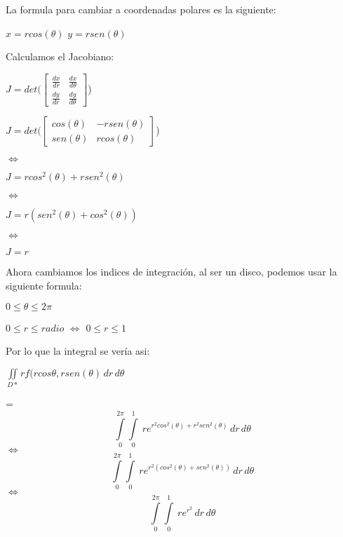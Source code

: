 \noindent La formula para cambiar a coordenadas polares es la siguiente:
\begin{center}
    $x=rcos(\theta)$     $y=rsen(\theta)$
\end{center}

\noindent Calculamos el Jacobiano:
\begin{center}
    $J = det(\begin{bmatrix}
        \frac{dx}{dr} & \frac{dx}{d\theta} \\
        \frac{dy}{dr} & \frac{dy}{d\theta}
    \end{bmatrix}$)
    \vspace{6pt}

    $J = det(\begin{bmatrix}
        cos(\theta) & -rsen(\theta) \\
        sen(\theta) & rcos(\theta)
    \end{bmatrix}$)
    \vspace{6pt}
    
    $\iff$ 
    
    $J = rcos^2(\theta) + rsen^2(\theta)$
    \vspace{6pt}
    
    $\iff$
    
    $J = r(sen^2(\theta)+cos^2(\theta))$
    \vspace{6pt}
    
    $\iff$ 
    \vspace{6pt}
    
    $J = r$
\end{center}

\noindent Ahora cambiamos los indices de integración, al ser un disco, podemos usar la siguiente formula:
\begin{center}
    $0 \leq \theta \leq 2\pi$
    \vspace{6pt}

    $0 \leq r \leq radio$ $\iff$ $0 \leq r \leq 1$
\end{center}

\noindent Por lo que la integral se vería asi:
    \begin{center}
        $\displaystyle\iint\limits_{D*} rf(rcos\theta,rsen(\theta) \, dr \, d\theta$

        =
        \[\displaystyle\int\limits_0^{2\pi} \!\!\int\limits_0^1 \ re^{r^2cos^2(\theta) + r^2sen^2(\theta)} \, dr \, d\theta\]
        $\iff$
        \[\displaystyle\int\limits_0^{2\pi} \!\!\int\limits_0^1 \ re^{r^2(cos^2(\theta) + sen^2(\theta))} \, dr \, d\theta\]
        $\iff$
        \[\displaystyle\int\limits_0^{2\pi} \!\!\int\limits_0^1 \ re^{r^2} \, dr \, d\theta\]
    \end{center} 

